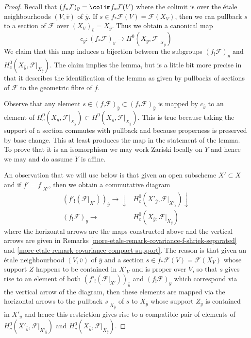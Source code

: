 \begin{proof}
Recall that $(f_*\mathcal{F})_{\overline{y}} = \colim f_*\mathcal{F}(V)$
where the colimit is over the \'etale neighbourhoods $(V, \overline{v})$
of $\overline{y}$. If $s \in f_*\mathcal{F}(V) = \mathcal{F}(X_V)$,
then we can pullback $s$ to a section of $\mathcal{F}$ over
$(X_V)_{\overline{v}} = X_{\overline{y}}$. Thus we obtain a canonical map
$$
c_{\overline{y}} :
(f_*\mathcal{F})_{\overline{y}}
\longrightarrow
H^0(X_{\overline{y}}, \mathcal{F}|_{X_{\overline{y}}})
$$
We claim that this map induces a bijection between the subgroups
$(f_!\mathcal{F})_{\overline{y}}$ and
$H^0_c(X_{\overline{y}}, \mathcal{F}|_{X_{\overline{y}}})$.
The claim implies the lemma, but is a little bit more precise
in that it describes the identification of the lemma as given
by pullbacks of sections of $\mathcal{F}$ to the geometric fibre of $f$.

\medskip\noindent
Observe that any element
$s \in (f_!\mathcal{F})_{\overline{y}} \subset (f_*\mathcal{F})_{\overline{y}}$
is mapped by $c_{\overline{y}}$ to an element of
$H^0_c(X_{\overline{y}}, \mathcal{F}|_{X_{\overline{y}}}) \subset
H^0(X_{\overline{y}}, \mathcal{F}|_{X_{\overline{y}}})$.
This is true because taking the support of a section
commutes with pullback and because properness is preserved by
base change. This at least produces the map in the statement of the lemma.
To prove that it is an isomorphism we may work Zariski
locally on $Y$ and hence we may and do assume $Y$ is affine.

\medskip\noindent
An observation that we will use below
is that given an open subscheme $X' \subset X$
and if $f' = f|_{X'}$, then we obtain a commutative diagram
$$
\begin{array}{cc}(f'_!(\mathcal{F}|_{X'}))_{\overline{y}} \longrightarrow\downarrow & H^0_c(X'_{\overline{y}}, \mathcal{F}|_{X'_{\overline{y}}}) \downarrow \\ (f_!\mathcal{F})_{\overline{y}} \longrightarrow & H^0_c(X_{\overline{y}}, \mathcal{F}|_{X_{\overline{y}}})\end{array}
$$
where the horizontal arrows are the maps constructed above and
the vertical arrows are given in
Remarks \ref{more-etale-remark-covariance-f-shriek-separated} and
\ref{more-etale-remark-covariance-compact-support}.
The reason is that given an \'etale neighbourhood $(V, \overline{v})$
of $\overline{y}$ and a section $s \in f_*\mathcal{F}(V) = \mathcal{F}(X_V)$
whose support $Z$ happens to be contained in $X'_V$ and is proper over $V$,
so that $s$ gives rise to an element of both
$(f'_!(\mathcal{F}|_{X'}))_{\overline{y}}$ and
$(f_!\mathcal{F})_{\overline{y}}$ which correspond via
the vertical arrow of the diagram, then these elements are mapped via the
horizontal arrows to the pullback $s|_{X_{\overline{y}}}$ of $s$ to
$X_{\overline{y}}$ whose support $Z_{\overline{y}}$ is contained in
$X'_{\overline{y}}$ and hence this restriction gives rise to
a compatible pair of elements of
$H^0_c(X'_{\overline{y}}, \mathcal{F}|_{X'_{\overline{y}}})$
and
$H^0_c(X_{\overline{y}}, \mathcal{F}|_{X_{\overline{y}}})$.


\end{proof}
